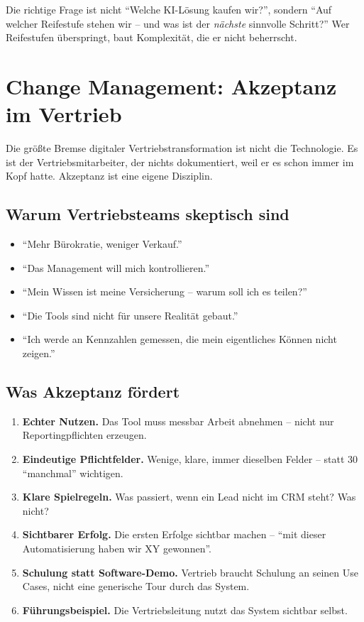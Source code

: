 \documentclass[11pt,a4paper,oneside]{article}
\begin{document}
\begin{merkbox}
Die richtige Frage ist nicht ``Welche KI-Lösung kaufen wir?'', sondern ``Auf welcher Reifestufe stehen wir -- und was ist der \emph{nächste} sinnvolle Schritt?'' Wer Reifestufen überspringt, baut Komplexität, die er nicht beherrscht.
\end{merkbox}

\section{Change Management: Akzeptanz im Vertrieb}

Die größte Bremse digitaler Vertriebstransformation ist nicht die Technologie. Es ist der Vertriebsmitarbeiter, der nichts dokumentiert, weil er es schon immer im Kopf hatte. Akzeptanz ist eine eigene Disziplin.

\subsection{Warum Vertriebsteams skeptisch sind}

\begin{itemize}
  \item ``Mehr Bürokratie, weniger Verkauf.''
  \item ``Das Management will mich kontrollieren.''
  \item ``Mein Wissen ist meine Versicherung -- warum soll ich es teilen?''
  \item ``Die Tools sind nicht für unsere Realität gebaut.''
  \item ``Ich werde an Kennzahlen gemessen, die mein eigentliches Können nicht zeigen.''
\end{itemize}

\subsection{Was Akzeptanz fördert}

\begin{enumerate}
  \item \textbf{Echter Nutzen.} Das Tool muss messbar Arbeit abnehmen -- nicht nur Reportingpflichten erzeugen.
  \item \textbf{Eindeutige Pflichtfelder.} Wenige, klare, immer dieselben Felder -- statt 30 ``manchmal'' wichtigen.
  \item \textbf{Klare Spielregeln.} Was passiert, wenn ein Lead nicht im CRM steht? Was nicht?
  \item \textbf{Sichtbarer Erfolg.} Die ersten Erfolge sichtbar machen -- ``mit dieser Automatisierung haben wir XY gewonnen''.
  \item \textbf{Schulung statt Software-Demo.} Vertrieb braucht Schulung an seinen Use Cases, nicht eine generische Tour durch das System.
  \item \textbf{Führungsbeispiel.} Die Vertriebsleitung nutzt das System sichtbar selbst.
\end{enumerate}
\end{document}
